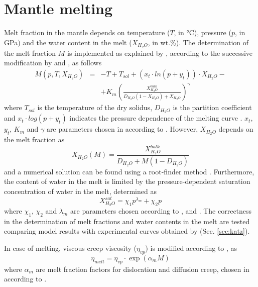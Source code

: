 \documentclass[hidelinks,10pt,a4paper]{article}
\begin{document}
\section{Mantle melting}\label{sec:melt}
Melt fraction in the mantle depends on temperature ($T$, in °C), pressure ($p$, in \si{\giga\pascal}) and the water content in the melt ($X_{H_2O}$, in wt.\%).
The determination of the melt fraction $M$ is implemented as explained by \citet{Katz2003}, according to the successive modification by \citet{Langmuir2006} and
\citet{Kelley2010}, as follows
\begin{eqnarray}\label{eq:melt_fr}
M(p,T,X_{H_2O})&=&-T+T_{sol}+(x_t\cdot ln(p+y_t))\cdot X_{H_2O}-\nonumber\\
&&+K_m\left(\frac{X_{H_2O}^{bulk}}{D_{H_2O}(1-X_{H_2O})+X_{H_2O}}\right)^{\gamma}
\end{eqnarray}
where $T_{sol}$ is the temperature of the dry solidus, $D_{H_2O}$ is the partition coefficient and $x_t\cdot log(p+y_t)$ indicates the pressure dependence of
the melting curve \citep{Kelley2010}. $x_t$, $y_t$, $K_m$ and $\gamma$ are parameters chosen in according to \citet{Kelley2010}.
However, $X_{H_2O}$ depends on the melt fraction as
\begin{equation}\label{eq:melt_wt}
X_{H_2O}(M)=\frac{X_{H_2O}^{bulk}}{D_{H_2O}+M(1-D_{H_2O})}
\end{equation}
and a numerical solution can be found using a root-finder method \citep{Katz2003,Wang2016}. Furthermore, the content of water in the melt is limited by the
pressure-dependent saturation concentration of water in the melt, determined as
\begin{equation}\label{eq:melt_max}
X_{H_2O}^{sat}=\chi_1 p^{\lambda_m}+\chi_2 p
\end{equation}
where $\chi_1$, $\chi_2$ and $\lambda_m$ are parameters chosen according to \citet{Katz2003}, \citet{Langmuir2006} and \citet{Kelley2010}. The correctness in
the determination of melt fractions and water contents in the melt are tested comparing model results with experimental curves obtained by \citet{Katz2003}
(Sec. \ref{sec:katz}).

In case of melting, viscous creep viscosity ($\eta_{vp}$) is modified according to \citet{Wang2016}, as
\begin{equation}\label{eq:melt_visc}
\eta_{melt}=\eta_{vp}\cdot \exp(\alpha_m M)
\end{equation}
where $\alpha_m$ are melt fraction factors for dislocation and diffusion creep, chosen in according to \citet{Wang2016}.
\end{document}

